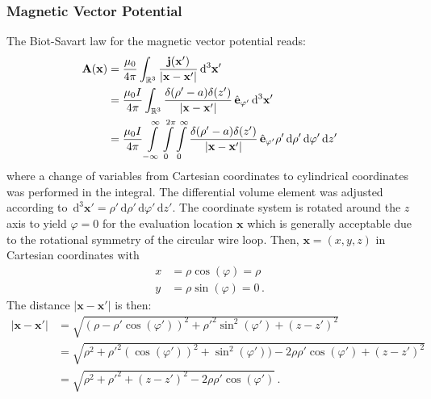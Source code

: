 \subsubsection{Magnetic Vector Potential}
The Biot-Savart law for the magnetic vector potential reads:
\begin{align}
  \mathbf{A}(\mathbf{x}) &= \frac{\mu_0  }{4 \pi}
                            \int_{\mathbb{R}^3}
                              \frac{\mathbf{j}(\mathbf{x}')}{|\mathbf{x} - \mathbf{x}'|} \,\mathrm{d}^3\mathbf{x}' \nonumber \\
             ~           &= \frac{\mu_0 I}{4 \pi}
                            \int_{\mathbb{R}^3}
                              \frac{\delta(\rho' - a) \delta(z')}{|\mathbf{x} - \mathbf{x}'|} \,\hat{\mathbf{e}}_{\varphi'}
                              \,\mathrm{d}^3\mathbf{x}' \nonumber \\
             ~           &= \frac{\mu_0 I}{4 \pi}
                            \int\limits_{-\infty}^{\infty} \int\limits_{0}^{2 \pi} \int\limits_{0}^{\infty}
                              \frac{\delta(\rho' - a) \delta(z')}{|\mathbf{x} - \mathbf{x}'|} \,\hat{\mathbf{e}}_{\varphi'}
                              \rho' \,\mathrm{d} \rho' \,\mathrm{d} \varphi'  \,\mathrm{d} z' \label{eqn:vecpot_loop_general}
\end{align}
where a change of variables from Cartesian coordinates to cylindrical coordinates was performed in the integral.
The differential volume element was adjusted according to
$\,\mathrm{d}^3\mathbf{x}' = \rho' \,\mathrm{d} \rho' \,\mathrm{d} \varphi'  \,\mathrm{d} z'$.
The coordinate system is rotated around the $z$ axis to yield $\varphi=0$ for the evaluation location $\mathbf{x}$
which is generally acceptable due to the rotational symmetry of the circular wire loop.
Then, $\mathbf{x} = (x, y, z)$ in Cartesian coordinates with
\begin{align}
  x &= \rho \cos(\varphi) = \rho \\
  y &= \rho \sin(\varphi) = 0    \, .
\end{align}
The distance $|\mathbf{x} - \mathbf{x}'|$ is then:
\begin{align}
  |\mathbf{x} - \mathbf{x}'| &= \sqrt{(\rho - \rho' \cos(\varphi'))^2 + \rho'^2 \sin^2(\varphi') + (z - z')^2} \nonumber \\
              ~              &= \sqrt{ \rho^2 + \rho'^2 (\cos(\varphi'))^2 + \sin^2(\varphi')) - 2 \rho \rho' \cos(\varphi') + (z - z')^2} \nonumber \\
              ~              &= \sqrt{ \rho^2 + \rho'^2 + (z - z')^2 - 2 \rho \rho' \cos(\varphi')} \, .
\end{align}
